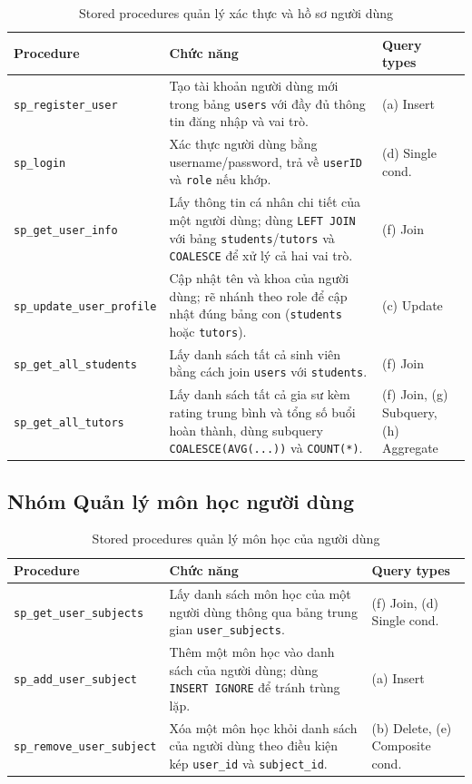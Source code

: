 \begin{table}[H]
\centering
\caption{Stored procedures quản lý xác thực và hồ sơ người dùng}
\label{tab:sp_auth}
\small
\begin{tabular}{|p{4.5cm}|p{7.5cm}|p{2.5cm}|}
\hline
\textbf{Procedure} & \textbf{Chức năng} & \textbf{Query types} \\
\hline
\texttt{sp\_register\_user} &
  Tạo tài khoản người dùng mới trong bảng \texttt{users} với đầy đủ thông tin đăng nhập và vai trò. &
  (a) Insert \\
\hline
\texttt{sp\_login} &
  Xác thực người dùng bằng username/password, trả về \texttt{userID} và \texttt{role} nếu khớp. &
  (d) Single cond. \\
\hline
\texttt{sp\_get\_user\_info} &
  Lấy thông tin cá nhân chi tiết của một người dùng; dùng \texttt{LEFT JOIN} với bảng \texttt{students}/\texttt{tutors} và \texttt{COALESCE} để xử lý cả hai vai trò. &
  (f) Join \\
\hline
\texttt{sp\_update\_user\_profile} &
  Cập nhật tên và khoa của người dùng; rẽ nhánh theo role để cập nhật đúng bảng con (\texttt{students} hoặc \texttt{tutors}). &
  (c) Update \\
\hline
\texttt{sp\_get\_all\_students} &
  Lấy danh sách tất cả sinh viên bằng cách join \texttt{users} với \texttt{students}. &
  (f) Join \\
\hline
\texttt{sp\_get\_all\_tutors} &
  Lấy danh sách tất cả gia sư kèm rating trung bình và tổng số buổi hoàn thành, dùng subquery \texttt{COALESCE(AVG(...))} và \texttt{COUNT(*)}. &
  (f) Join, (g) Subquery, (h) Aggregate \\
\hline
\end{tabular}
\end{table}

\subsection{Nhóm Quản lý môn học người dùng}

\begin{table}[H]
\centering
\caption{Stored procedures quản lý môn học của người dùng}
\label{tab:sp_subjects}
\small
\begin{tabular}{|p{4.5cm}|p{7.5cm}|p{2.5cm}|}
\hline
\textbf{Procedure} & \textbf{Chức năng} & \textbf{Query types} \\
\hline
\texttt{sp\_get\_user\_subjects} &
  Lấy danh sách môn học của một người dùng thông qua bảng trung gian \texttt{user\_subjects}. &
  (f) Join, (d) Single cond. \\
\hline
\texttt{sp\_add\_user\_subject} &
  Thêm một môn học vào danh sách của người dùng; dùng \texttt{INSERT IGNORE} để tránh trùng lặp. &
  (a) Insert \\
\hline
\texttt{sp\_remove\_user\_subject} &
  Xóa một môn học khỏi danh sách của người dùng theo điều kiện kép \texttt{user\_id} và \texttt{subject\_id}. &
  (b) Delete, (e) Composite cond. \\
\hline
\end{tabular}
\end{table}


